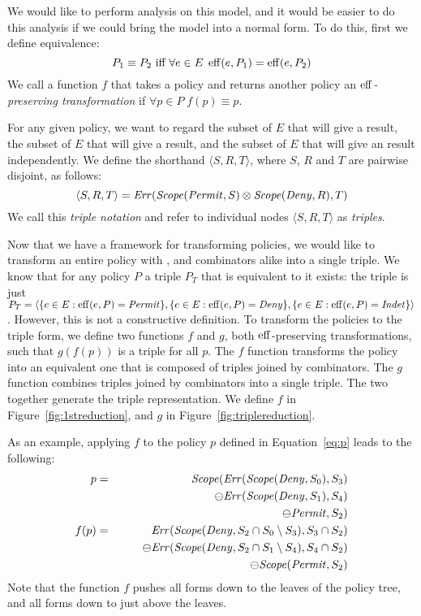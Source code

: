 We would like to perform analysis on this model, and it would be
easier to do this analysis if we could bring the model into a normal
form.  To do this, first we define equivalence:
\begin{equation*}
  P_1 \equiv P_2 \text{ iff } \forall e \in E \; \operatorname{eff} (e, P_1) = \operatorname{eff} (e, P_2)
\end{equation*}
We call a function $f$ that takes a policy and returns another
policy an \emph{$\operatorname{eff}$-preserving transformation} if $\forall p \in P
\; f (p) \equiv p$.

For any given policy, we want to regard the subset of $E$ that will
give a \Permit{} result, the subset of $E$ that will give a \Deny{}
result, and the subset of $E$ that will give an \Indeterminate{} result
independently.  We define the shorthand $\langle S, R, T \rangle$,
where $S$, $R$ and $T$ are pairwise disjoint, as follows:
\begin{equation*}
  \langle S, R, T \rangle = \text{\textit{Err}} (\text{\textit{Scope}} (\text{\textit{Permit}}, S) \otimes \text{\textit{Scope}} (\text{\textit{Deny}}, R), T)
\end{equation*}
We call this \emph{triple notation} and refer to individual nodes
$\langle S, R, T \rangle$ as \emph{triples}.

Now that we have a framework for transforming policies, we would like
to transform an entire policy with \Scope, \Err and combinators alike
into a single triple.  We know that for any policy $P$ a triple $P_T$
that is equivalent to it exists: the triple is just $P_T = \langle \{
e \in E : \operatorname{eff} (e, P) = \text{\textit{Permit}} \}, \{ e \in E : \operatorname{eff} (e, P) = \text{\textit{Deny}}
\}, \{ e \in E : \operatorname{eff} (e, P) = \text{\textit{Indet}} \}\rangle$.  However,
this is not a constructive definition.  To transform the policies to
the triple form, we define two functions $f$ and $g$, both
$\operatorname{eff}$-preserving transformations, such that $g (f(p))$ is a triple
for all $p$.  The $f$ function transforms the policy into an
equivalent one that is composed of triples joined by combinators.  The
$g$ function combines triples joined by combinators into a single
triple.  The two together generate the triple representation.  We
define $f$ in Figure~\ref{fig:1streduction}, and $g$ in
Figure~\ref{fig:triplereduction}.

As an example, applying $f$ to the policy $p$ defined in
Equation~\eqref{eq:p} leads to the following:
\begin{eqnarray*}
  p & = & \text{\textit{Scope}} (\text{\textit{Err}} (\text{\textit{Scope}} (\text{\textit{Deny}}, S_0), S_3) \\
  & & \qquad \ominus \text{\textit{Err}} (\text{\textit{Scope}} (\text{\textit{Deny}}, S_1), S_4) \\
  & & \qquad \ominus \text{\textit{Permit}}, S_2) \nonumber \\
  f(p)  & = & \text{\textit{Err}} (\text{\textit{Scope}} (\text{\textit{Deny}}, S_2 \cap S_0 \setminus S_3), S_3 \cap S_2) \\
  & & \qquad \ominus
  \text{\textit{Err}} (\text{\textit{Scope}} (\text{\textit{Deny}}, S_2 \cap S_1 \setminus S_4), S_4 \cap S_2) \\
  & & \qquad \ominus \text{\textit{Scope}} (\text{\textit{Permit}}, S_2)
\end{eqnarray*}
Note that the function $f$ pushes all \Scope forms down to the leaves
of the policy tree, and all \Err forms down to just above the leaves.

